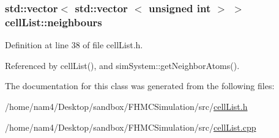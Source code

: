 \hypertarget{classcell_list_ada607886d0e5a20d710dde694d6d989f}{
\subsubsection[{neighbours}]{\setlength{\rightskip}{0pt plus 5cm}std\-::vector$<$ std\-::vector $<$ unsigned int $>$ $>$ cell\-List\-::neighbours}}\label{classcell_list_ada607886d0e5a20d710dde694d6d989f}


Definition at line 38 of file cell\-List.\-h.



Referenced by cell\-List(), and sim\-System\-::get\-Neighbor\-Atoms().



The documentation for this class was generated from the following files\-:\begin{DoxyCompactItemize}
\item 
/home/nam4/\-Desktop/sandbox/\-F\-H\-M\-C\-Simulation/src/\hyperlink{cell_list_8h}{cell\-List.\-h}\item 
/home/nam4/\-Desktop/sandbox/\-F\-H\-M\-C\-Simulation/src/\hyperlink{cell_list_8cpp}{cell\-List.\-cpp}\end{DoxyCompactItemize}
